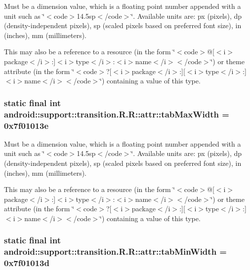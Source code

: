 Must be a dimension value, which is a floating point number appended with a unit such as \char`\"{}$<$code$>$14.5sp$<$/code$>$\char`\"{}. Available units are: px (pixels), dp (density-independent pixels), sp (scaled pixels based on preferred font size), in (inches), mm (millimeters). 

This may also be a reference to a resource (in the form \char`\"{}$<$code$>$@\mbox{[}$<$i$>$package$<$/i$>$:\mbox{]}$<$i$>$type$<$/i$>$:$<$i$>$name$<$/i$>$$<$/code$>$\char`\"{}) or theme attribute (in the form \char`\"{}$<$code$>$?\mbox{[}$<$i$>$package$<$/i$>$:\mbox{]}\mbox{[}$<$i$>$type$<$/i$>$:\mbox{]}$<$i$>$name$<$/i$>$$<$/code$>$\char`\"{}) containing a value of this type. \hypertarget{classandroid_1_1support_1_1transition_1_1_r_1_1attr_8e01f32ece14dfb62c20584aee1cf5bb}{
\subsubsection[{tabMaxWidth}]{\setlength{\rightskip}{0pt plus 5cm}static final int android::support::transition.R.R::attr::tabMaxWidth = 0x7f01013e}}
\label{classandroid_1_1support_1_1transition_1_1_r_1_1attr_8e01f32ece14dfb62c20584aee1cf5bb}


Must be a dimension value, which is a floating point number appended with a unit such as \char`\"{}$<$code$>$14.5sp$<$/code$>$\char`\"{}. Available units are: px (pixels), dp (density-independent pixels), sp (scaled pixels based on preferred font size), in (inches), mm (millimeters). 

This may also be a reference to a resource (in the form \char`\"{}$<$code$>$@\mbox{[}$<$i$>$package$<$/i$>$:\mbox{]}$<$i$>$type$<$/i$>$:$<$i$>$name$<$/i$>$$<$/code$>$\char`\"{}) or theme attribute (in the form \char`\"{}$<$code$>$?\mbox{[}$<$i$>$package$<$/i$>$:\mbox{]}\mbox{[}$<$i$>$type$<$/i$>$:\mbox{]}$<$i$>$name$<$/i$>$$<$/code$>$\char`\"{}) containing a value of this type. \hypertarget{classandroid_1_1support_1_1transition_1_1_r_1_1attr_fa0e2cab53a19d235d3b36e384d2701b}{
\subsubsection[{tabMinWidth}]{\setlength{\rightskip}{0pt plus 5cm}static final int android::support::transition.R.R::attr::tabMinWidth = 0x7f01013d}}
\label{classandroid_1_1support_1_1transition_1_1_r_1_1attr_fa0e2cab53a19d235d3b36e384d2701b}


